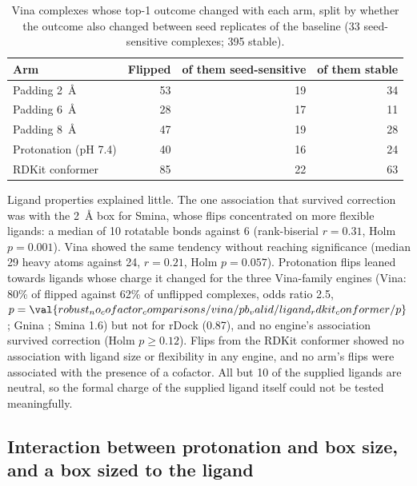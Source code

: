 \begin{table}[h]
  \centering
  \caption{Vina complexes whose top-1 outcome changed with each arm, split by whether
    the outcome also changed between seed replicates of the baseline (33 seed-sensitive
    complexes; 395 stable).}
  \label{tab:stable-flips}
  \begin{tabular}{lrrr}
    \toprule
    Arm & Flipped & of them seed-sensitive & of them stable \\
    \midrule
    Padding \SI{2}{\angstrom} & 53 & 19 & 34 \\
    Padding \SI{6}{\angstrom} & 28 & 17 & 11 \\
    Padding \SI{8}{\angstrom} & 47 & 19 & 28 \\
    Protonation (pH 7.4) & 40 & 16 & 24 \\
    RDKit conformer & 85 & 22 & 63 \\
    \bottomrule
  \end{tabular}
\end{table}

Ligand properties explained little. The one association that survived correction was with
the \SI{2}{\angstrom} box for Smina, whose flips concentrated on more flexible ligands: a
median of 10 rotatable bonds against 6 (rank-biserial $r = 0.31$, Holm $p = 0.001$). Vina
showed the same tendency without reaching significance (median 29 heavy atoms against 24,
$r = 0.21$, Holm $p = 0.057$). Protonation flips leaned towards ligands whose charge it
changed for the three Vina-family engines (Vina: 80\% of flipped against 62\% of unflipped
complexes, odds ratio 2.5, $p = \val{robust_no_cofactor_comparisons/vina/pb_valid/ligand_rdkit_conformer/p}$; Gnina ; Smina 1.6) but not for rDock (0.87),
and no engine's association survived correction (Holm $p \ge 0.12$). Flips from the RDKit conformer showed no association with ligand size
or flexibility in any engine, and no arm's flips were associated with the presence of a
cofactor. All but 10 of the supplied ligands are neutral, so the formal charge of the
supplied ligand itself could not be tested meaningfully.

\subsection{Interaction between protonation and box size, and a box sized to the ligand}
\label{sec:interaction}

